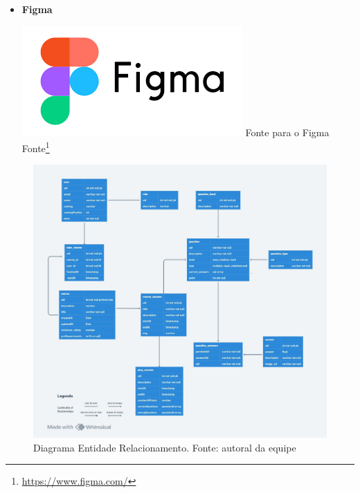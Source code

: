 \documentclass[12pt, openany, oneside, a4paper, english, brazil]{abntex2}   %
\begin{document}
\begin{itemize}
    \item \textbf{Figma}
    \begin{center}
    \includegraphics[width=0.5\linewidth]{figuras/Tecnologies/Figma.png}
    \label{fig:Figma}
    Fonte para o Figma Fonte\footnote{\url{https://www.figma.com/}}
    \end{center}

   
\end{itemize}

\begin{figure}[h!]
    \centering
    \includegraphics[width=0.8\linewidth]{figuras/DiagramsUMLs/Entidade Relacionamento Math.Pow.jpg}
    \caption{Diagrama Entidade Relacionamento. Fonte: autoral da equipe}
    \label{fig:Figma}
\end{figure}
\end{document}
